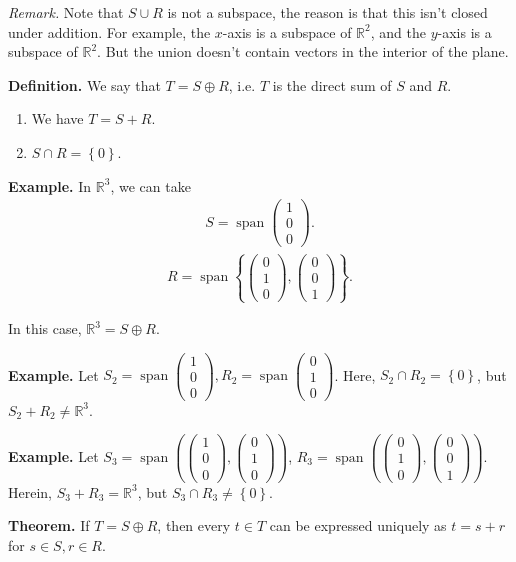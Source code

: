 \documentclass{article}
\newcommand{\mat}[1]{\begin{pmatrix}#1\end{pmatrix}}
\newcommand{\RR}{\mathbb{R}}
\DeclareMathOperator{\Span}{span}
\begin{document}
{\it Remark.} Note that $S \cup R$ is not a subspace, the reason is that this isn't closed under addition.  For example, the $x$-axis is a subspace of $\mathbb{R}^2$, and the $y$-axis is a subspace of $\RR^2$.  But the union doesn't contain vectors in the interior of the plane.

{\bf Definition.} We say that $T = S \oplus R$, i.e. $T$ is the direct sum of $S$ and $R$.

\begin{enumerate}
  \item We have $T = S+R$.
  \item $S \cap R = \left\{ 0 \right\}$.
\end{enumerate}

{\bf Example.} In $\mathbb{R}^3$, we can take
\begin{align*}
  S = \Span \mat{1 \\ 0 \\ 0}.
\end{align*}
\begin{align*}
  R = \Span \left\{ \mat{0 \\ 1 \\ 0}, \mat{0 \\ 0 \\ 1} \right\}.
\end{align*}

In this case, $\mathbb{R}^3 = S \oplus R$.

{\bf Example.} Let $S_2 = \Span \mat{ 1 \\ 0 \\ 0}, R_2 = \Span \mat{ 0 \\ 1 \\ 0}$.  Here, $S_2 \cap R_2 = \left\{ 0 \right\}$, but $S_2 + R_2 \neq \mathbb{R}^3$.

{\bf Example.} Let $S_3 = \Span \left( \mat{1 \\ 0 \\ 0}, \mat{0 \\ 1 \\ 0} \right)$, $R_3 = \Span \left( \mat{0 \\ 1 \\ 0}, \mat{0 \\ 0 \\ 1} \right)$.  Herein, $S_3 + R_3 = \mathbb{R}^3$, but $S_3 \cap R_3 \neq \left\{ 0 \right\}$.

{\bf Theorem.} If $T = S \oplus R$, then every $t \in T$ can be expressed uniquely as $t = s+r$ for $s \in S, r \in R$.
\end{document}
